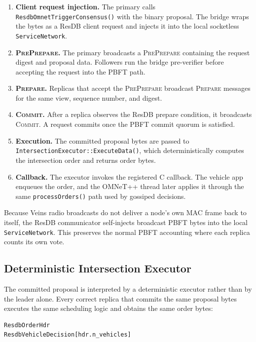 \documentclass[fleqn,10pt]{olplainarticle}
\begin{document}
\begin{enumerate}
    \item \textbf{Client request injection.} The primary calls \texttt{ResdbOmnetTriggerConsensus()} with the binary proposal. The bridge wraps the bytes as a ResDB client request and injects it into the local socketless \texttt{ServiceNetwork}.
    \item \textbf{\textsc{PrePrepare}.} The primary broadcasts a \textsc{PrePrepare} containing the request digest and proposal data. Followers run the bridge pre-verifier before accepting the request into the PBFT path.
    \item \textbf{\textsc{Prepare}.} Replicas that accept the \textsc{PrePrepare} broadcast \textsc{Prepare} messages for the same view, sequence number, and digest.
    \item \textbf{\textsc{Commit}.} After a replica observes the ResDB prepare condition, it broadcasts \textsc{Commit}. A request commits once the PBFT commit quorum is satisfied.
    \item \textbf{Execution.} The committed proposal bytes are passed to \texttt{IntersectionExecutor::ExecuteData()}, which deterministically computes the intersection order and returns order bytes.
    \item \textbf{Callback.} The executor invokes the registered C callback. The vehicle app enqueues the order, and the OMNeT++ thread later applies it through the same \texttt{processOrders()} path used by gossiped decisions.
\end{enumerate}

Because Veins radio broadcasts do not deliver a node's own MAC frame back to itself, the ResDB communicator self-injects broadcast PBFT bytes into the local \texttt{ServiceNetwork}. This preserves the normal PBFT accounting where each replica counts its own vote.

\subsection{Deterministic Intersection Executor}
\label{subsec:intersection-executor}

The committed proposal is interpreted by a deterministic executor rather than by the leader alone. Every correct replica that commits the same proposal bytes executes the same scheduling logic and obtains the same order bytes:

\begin{verbatim}
ResdbOrderHdr
ResdbVehicleDecision[hdr.n_vehicles]
\end{verbatim}
\end{document}
